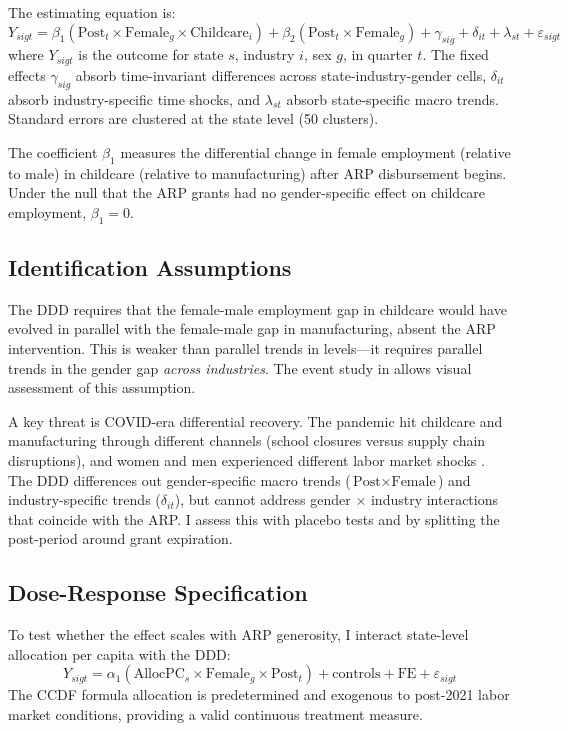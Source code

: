 \documentclass[12pt]{article}
\begin{document}
The estimating equation is:
\begin{equation}
\label{eq:ddd}
Y_{sigt} = \beta_1 (\text{Post}_t \times \text{Female}_g \times \text{Childcare}_i) + \beta_2 (\text{Post}_t \times \text{Female}_g) + \gamma_{sig} + \delta_{it} + \lambda_{st} + \varepsilon_{sigt}
\end{equation}
where $Y_{sigt}$ is the outcome for state $s$, industry $i$, sex $g$, in quarter $t$. The fixed effects $\gamma_{sig}$ absorb time-invariant differences across state-industry-gender cells, $\delta_{it}$ absorb industry-specific time shocks, and $\lambda_{st}$ absorb state-specific macro trends. Standard errors are clustered at the state level (50 clusters).

The coefficient $\beta_1$ measures the differential change in female employment (relative to male) in childcare (relative to manufacturing) after ARP disbursement begins. Under the null that the ARP grants had no gender-specific effect on childcare employment, $\beta_1 = 0$.

\subsection{Identification Assumptions}

The DDD requires that the female-male employment gap in childcare would have evolved in parallel with the female-male gap in manufacturing, absent the ARP intervention. This is weaker than parallel trends in levels---it requires parallel trends in the gender gap \emph{across industries}. The event study in  allows visual assessment of this assumption.

A key threat is COVID-era differential recovery. The pandemic hit childcare and manufacturing through different channels (school closures versus supply chain disruptions), and women and men experienced different labor market shocks \citep{alon2020impact}. The DDD differences out gender-specific macro trends ($\text{Post} \times \text{Female}$) and industry-specific trends ($\delta_{it}$), but cannot address gender $\times$ industry interactions that coincide with the ARP. I assess this with placebo tests and by splitting the post-period around grant expiration.

\subsection{Dose-Response Specification}

To test whether the effect scales with ARP generosity, I interact state-level allocation per capita with the DDD:
\begin{equation}
Y_{sigt} = \alpha_1 (\text{AllocPC}_s \times \text{Female}_g \times \text{Post}_t) + \text{controls} + \text{FE} + \varepsilon_{sigt}
\end{equation}
The CCDF formula allocation is predetermined and exogenous to post-2021 labor market conditions, providing a valid continuous treatment measure.
\end{document}
